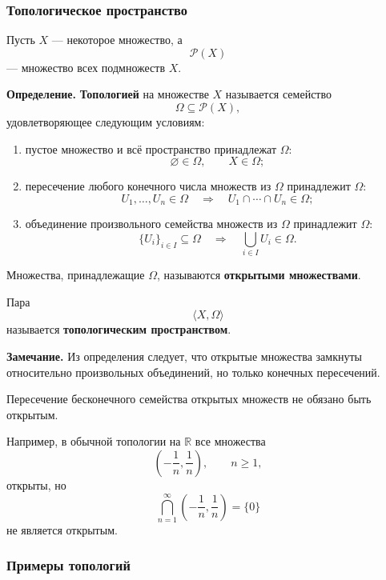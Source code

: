 \documentclass[12pt,a4paper,oneside,openany]{book}
\theoremstyle{definition}
\theoremstyle{plain}
\theoremstyle{remark}
\begin{document}
\subsubsection{Топологическое пространство}

Пусть \(X\) --- некоторое множество, а
\[
\mathcal P(X)
\]
--- множество всех подмножеств \(X\).

\textbf{Определение.}
\textbf{Топологией} на множестве \(X\) называется семейство
\[
\Omega\subseteq\mathcal P(X),
\]
удовлетворяющее следующим условиям:

\begin{enumerate}
    \item пустое множество и всё пространство принадлежат \(\Omega\):
          \[
          \varnothing\in\Omega,
          \qquad
          X\in\Omega;
          \]

    \item пересечение любого конечного числа множеств из \(\Omega\)
          принадлежит \(\Omega\):
          \[
          U_1,\ldots,U_n\in\Omega
          \quad\Longrightarrow\quad
          U_1\cap\cdots\cap U_n\in\Omega;
          \]

    \item объединение произвольного семейства множеств из \(\Omega\)
          принадлежит \(\Omega\):
          \[
          \{U_i\}_{i\in I}\subseteq\Omega
          \quad\Longrightarrow\quad
          \bigcup_{i\in I}U_i\in\Omega.
          \]
\end{enumerate}

Множества, принадлежащие \(\Omega\), называются
\textbf{открытыми множествами}.

Пара
\[
\langle X,\Omega\rangle
\]
называется \textbf{топологическим пространством}.

\textbf{Замечание.}
Из определения следует, что открытые множества замкнуты относительно
произвольных объединений, но только конечных пересечений.

Пересечение бесконечного семейства открытых множеств не обязано быть
открытым.

Например, в обычной топологии на \(\mathbb R\) все множества
\[
\left(-\frac{1}{n},\frac{1}{n}\right),
\qquad n\geq 1,
\]
открыты, но
\[
\bigcap_{n=1}^{\infty}
\left(-\frac{1}{n},\frac{1}{n}\right)
=
\{0\}
\]
не является открытым.

\subsubsection{Примеры топологий}
\end{document}
